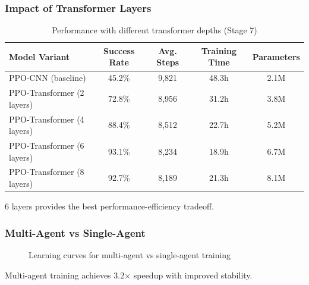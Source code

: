 \documentclass[12pt,a4paper]{article}
\begin{document}
\subsubsection{Impact of Transformer Layers}

\begin{table}[h]
\centering
\begin{tabular}{lcccc}
\toprule
Model Variant & Success Rate & Avg. Steps & Training Time & Parameters \\
\midrule
PPO-CNN (baseline) & 45.2\% & 9,821 & 48.3h & 2.1M \\
PPO-Transformer (2 layers) & 72.8\% & 8,956 & 31.2h & 3.8M \\
PPO-Transformer (4 layers) & 88.4\% & 8,512 & 22.7h & 5.2M \\
PPO-Transformer (6 layers) & 93.1\% & 8,234 & 18.9h & 6.7M \\
PPO-Transformer (8 layers) & 92.7\% & 8,189 & 21.3h & 8.1M \\
\bottomrule
\end{tabular}
\caption{Performance with different transformer depths (Stage 7)}
\label{tab:transformer_ablation}
\end{table}

6 layers provides the best performance-efficiency tradeoff.

\subsubsection{Multi-Agent vs Single-Agent}

\begin{figure}[h]
\centering
{}
\caption{Learning curves for multi-agent vs single-agent training}
\label{fig:multi_vs_single}
\end{figure}

Multi-agent training achieves 3.2× speedup with improved stability.
\end{document}
